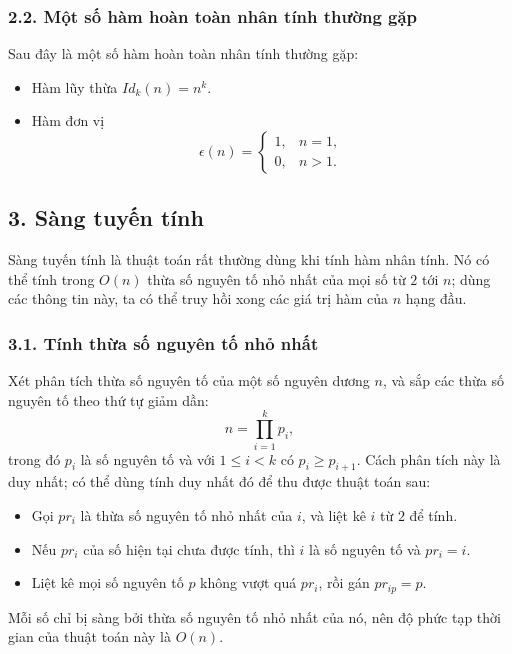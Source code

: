 \documentclass[11pt]{article}
\begin{document}
\subsubsection*{2.2. Một số hàm hoàn toàn nhân tính thường gặp}

Sau đây là một số hàm hoàn toàn nhân tính thường gặp:
\begin{itemize}
  \item Hàm lũy thừa \(Id_k(n)=n^k\).
  \item Hàm đơn vị
  \[
    \epsilon(n)=
    \begin{cases}
      1, & n=1,\\
      0, & n>1.
    \end{cases}
  \]
\end{itemize}

\subsection*{3. Sàng tuyến tính}

Sàng tuyến tính là thuật toán rất thường dùng khi tính hàm nhân tính. Nó có
thể tính trong \(O(n)\) thừa số nguyên tố nhỏ nhất của mọi số từ \(2\) tới
\(n\); dùng các thông tin này, ta có thể truy hồi xong các giá trị hàm của
\(n\) hạng đầu.

\subsubsection*{3.1. Tính thừa số nguyên tố nhỏ nhất}

Xét phân tích thừa số nguyên tố của một số nguyên dương \(n\), và sắp các thừa
số nguyên tố theo thứ tự giảm dần:
\[
  n=\prod_{i=1}^{k} p_i,
\]
trong đó \(p_i\) là số nguyên tố và với \(1\le i<k\) có \(p_i\ge p_{i+1}\).
Cách phân tích này là duy nhất; có thể dùng tính duy nhất đó để thu được thuật
toán sau:
\begin{itemize}
  \item Gọi \(pr_i\) là thừa số nguyên tố nhỏ nhất của \(i\), và liệt kê \(i\)
  từ \(2\) để tính.
  \item Nếu \(pr_i\) của số hiện tại chưa được tính, thì \(i\) là số nguyên
  tố và \(pr_i=i\).
  \item Liệt kê mọi số nguyên tố \(p\) không vượt quá \(pr_i\), rồi gán
  \(pr_{ip}=p\).
\end{itemize}

Mỗi số chỉ bị sàng bởi thừa số nguyên tố nhỏ nhất của nó, nên độ phức tạp thời
gian của thuật toán này là \(O(n)\).
\end{document}
